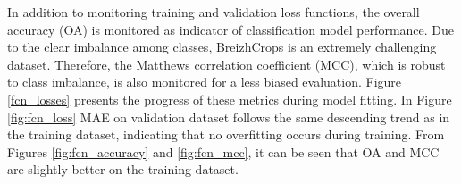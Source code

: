 \documentclass[journal,article,submit,pdftex,moreauthors]{Definitions/mdpi}
\begin{document}



In addition to monitoring training and validation loss functions, the overall accuracy (OA) is monitored as indicator of classification model performance. Due to the clear imbalance among classes, BreizhCrops is an extremely challenging dataset. Therefore, the Matthews correlation coefficient (MCC), which is robust to class imbalance, is also monitored for a less biased evaluation. Figure \ref{fcn_losses} presents the progress of these metrics during model fitting.
In Figure \ref{fig:fcn_loss} MAE on validation dataset follows the same descending trend as in the training dataset, indicating that no overfitting occurs during training. From Figures \ref{fig:fcn_accuracy} and \ref{fig:fcn_mcc}, it can be seen that OA and MCC are slightly better on the training dataset.
\end{document}
